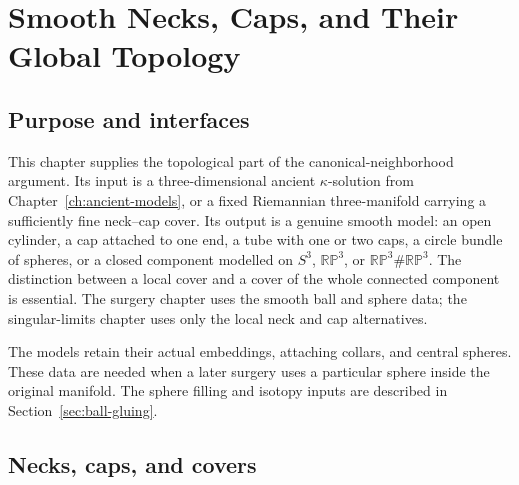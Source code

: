 \chapter{Smooth Necks, Caps, and Their Global Topology}
\label{ch:neck-cap-topology}

\section{Purpose and interfaces}

This chapter supplies the topological part of the canonical-neighborhood
argument.  Its input is a three-dimensional ancient $\kappa$-solution from
Chapter~\ref{ch:ancient-models}, or a fixed Riemannian three-manifold carrying
a sufficiently fine neck--cap cover.  Its output is a genuine smooth model:
an open cylinder, a cap attached to one end, a tube with one or two caps, a
circle bundle of spheres, or a closed component modelled on $S^3$,
$\mathbb{RP}^3$, or $\mathbb{RP}^3\#\mathbb{RP}^3$.  The
distinction between a local cover and a cover of the whole connected component
is essential.  The surgery chapter uses the smooth ball and sphere data; the
singular-limits chapter uses only the local neck and cap alternatives.

The models retain their actual embeddings, attaching collars, and central
spheres.  These data are needed when a later surgery uses a particular
sphere inside the original manifold.  The sphere filling and isotopy inputs
are described in Section~\ref{sec:ball-gluing}.

\section{Necks, caps, and covers}
\label{sec:neck-cap-definitions}

